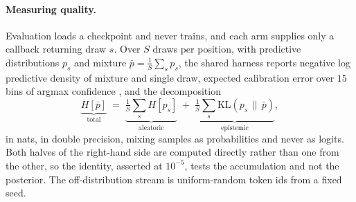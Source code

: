 \begin{table}[t]
  \centering
  \small
  
  \caption{Every parameter-sized region of the mean-field step, touches counted at the
  launch sites and converted at $P \cdot 4$ bytes each. The aggregate row is the sum of
  the rows above it; \texttt{*fused\_step} is the same work after folding.}
  \label{tab:bandwidth}
\end{table}

\paragraph{Measuring quality.}
Evaluation loads a checkpoint and never trains, and each arm supplies only a callback
returning draw $s$. Over $S$ draws per position, with predictive distributions $p_s$
and mixture $\bar{p} = \frac{1}{S}\sum_s p_s$, the shared harness reports negative log
predictive density of mixture and single draw, expected calibration error over $15$
bins of argmax confidence \citep{guo2017calibration}, and the decomposition
\citep{kendall2017uncertainties}
\begin{equation}
  \underbrace{H[\bar{p}]}_{\text{total}}
  \;=\;
  \underbrace{\tfrac{1}{S}\textstyle\sum_s H[p_s]}_{\text{aleatoric}}
  \;+\;
  \underbrace{\tfrac{1}{S}\textstyle\sum_s \mathrm{KL}(p_s \,\|\, \bar{p})}_{\text{epistemic}} ,
  \label{eq:decomp}
\end{equation}
in nats, in double precision, mixing samples as probabilities and never as logits.
Both halves of the right-hand side are computed directly rather than one from the other,
so the identity, asserted at $10^{-5}$, tests the accumulation and not the posterior.
The off-distribution stream is uniform-random token ids from a fixed seed.
